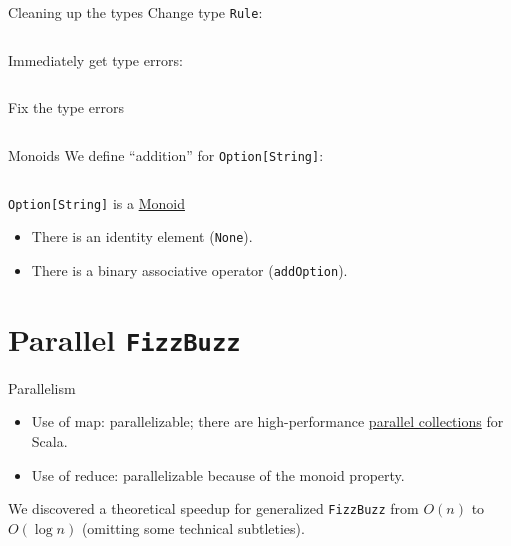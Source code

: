 \begin{frame}[fragile]{Cleaning up the types}
  Change type \texttt{Rule}:
  \inputminted[gobble=2]{scala}{FizzBuzz6.scala}

  Immediately get type errors:

  \inputminted[gobble=2]{console}{testQuick10.console}
\end{frame}

\begin{frame}[fragile]{Fix the type errors}

  \inputminted[gobble=2]{scala}{FizzBuzz7.scala}
\end{frame}

\begin{frame}[fragile]{Monoids}
  We define ``addition'' for \texttt{Option[String]}:
  \inputminted[gobble=2]{scala}{FizzBuzz8.scala}
  
  \begin{block}{\texttt{Option[String]} is a \href{http://en.wikipedia.org/wiki/Monoid}{Monoid}}
  \begin{itemize}
  \item There is an identity element (\texttt{None}).
  \item There is a binary associative operator (\texttt{addOption}).
  \end{itemize}
  \end{block}
\end{frame}

\section{Parallel \texttt{FizzBuzz}}

\begin{frame}[fragile]{Parallelism}
  \begin{itemize}
  \item Use of \alert{map}: parallelizable; there are high-performance \href{http://scala-blitz.github.io/}{parallel collections} for Scala.
  \item Use of \alert{reduce}: parallelizable because of the monoid property.
  \end{itemize}

  We discovered a theoretical speedup for generalized \texttt{FizzBuzz} from $O(n)$ to $O(\log n)$ (omitting some technical subtleties).

\end{frame}

